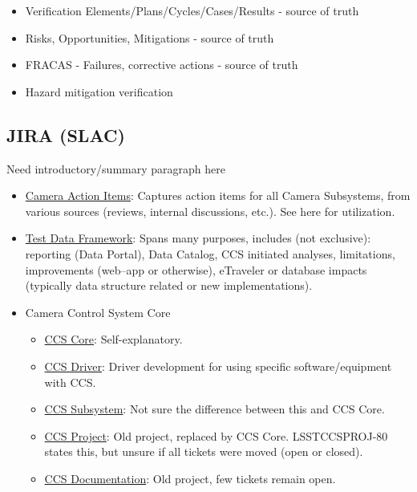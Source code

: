 \begin{itemize}
	\item Verification Elements/Plans/Cycles/Cases/Results - source of truth
	\item Risks, Opportunities, Mitigations - source of truth
	\item FRACAS - Failures, corrective actions - source of truth
	\item Hazard mitigation verification
\end{itemize}

\subsection{JIRA (SLAC)}

Need introductory/summary paragraph here

\begin{itemize}
	\item \href{https://jira.slac.stanford.edu/browse/LCAI}{Camera Action Items}: Captures action items for all Camera Subsystems, from various sources (reviews, internal discussions, etc.). See here for utilization.
	\item \href{https://jira.slac.stanford.edu/browse/LSSTTD}{Test Data Framework}:  Spans many purposes, includes (not exclusive): reporting (Data Portal), Data Catalog, CCS initiated analyses, limitations, improvements (web--app or otherwise), eTraveler or database impacts (typically data structure related or new implementations).
	\item Camera Control System Core
	\begin{itemize}
		\item \href{https://jira.slac.stanford.edu/browse/LSSTCCS}{CCS Core}:  Self-explanatory.
		\item \href{https://jira.slac.stanford.edu/browse/LSSTCCSDRIVER}{CCS Driver}:  Driver development for using specific software/equipment with CCS.
		\item \href{https://jira.slac.stanford.edu/browse/LSSTCCSSUB}{CCS Subsystem}:   Not sure the difference between this and CCS Core.
		\item \href{https://jira.slac.stanford.edu/browse/LSSTCCSPROJ}{CCS Project}:  Old project, replaced by CCS Core. LSSTCCSPROJ-80 states this, but unsure if all tickets were moved (open or closed).
		\item \href{https://jira.slac.stanford.edu/browse/LSSTCCSDOC}{CCS Documentation}:  Old project, few tickets remain open.
	\end{itemize}

\end{itemize}
